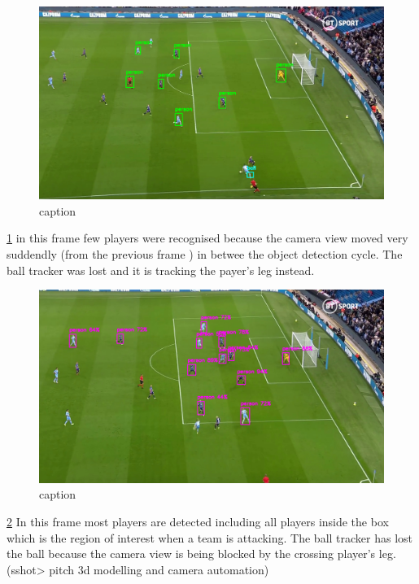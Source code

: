 \documentclass[
11pt,
twoside
]{report}
\begin{document}
\begin{figure}[H]
    \includegraphics[keepaspectratio, width=\columnwidth]{Screenshot_2022-03-03_23-12-29.png}
    \caption{caption}
    \label{img:15}
\end{figure}
\ref{img:15} in this
frame few players were recognised because the camera view moved very
suddendly (from the previous frame ) in betwee the object detection
cycle. The ball tracker was lost and it is tracking the payer's leg
instead.

\begin{figure}[H]
    \includegraphics[keepaspectratio, width=\columnwidth]{Screenshot_2022-03-03_23-13-18.png}
    \caption{caption}
    \label{img:16}
\end{figure}
\ref{img:16} In this
frame most players are detected including all players inside the box
which is the region of interest when a team is attacking. The ball
tracker has lost the ball because the camera view is being blocked by
the crossing player's leg. (sshot\textgreater{} pitch 3d modelling and
camera automation)
\end{document}

